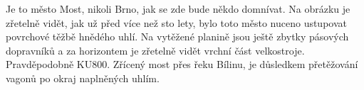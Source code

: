 
Je to město Most, nikoli Brno, jak se zde bude někdo domnívat. Na
obrázku je zřetelně vidět, jak už před více než sto lety, bylo toto
město nuceno ustupovat povrchové těžbě hnědého uhlí. Na vytěžené
planině jsou ještě zbytky pásových dopravníků a za horizontem je
zřetelně vidět vrchní část velkostroje. Pravděpodobně KU800. Zřícený
most přes řeku Bílinu, je důsledkem přetěžování vagonů po okraj
naplněných uhlím.

